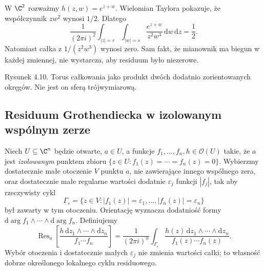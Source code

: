 \begin{przyklad}
W $\C^2$ rozważmy $h(z,w)=e^{z+w}$.
Wielomian Taylora pokazuje, że współczynnik $zw^2$ wynosi $1/2$.
Dlatego
\[
\frac{1}{(2\pi i)^2}\int_{|z|=r}\int_{|w|=s}
\frac{e^{z+w}}{z^2w^3}\,\mathrm dw\,\mathrm dz=\frac12.
\]
Natomiast całka z $1/(z^2w^3)$ wynosi zero. Sam fakt,
że mianownik ma biegun w każdej zmiennej, nie wystarcza,
aby residuum było niezerowe.
\end{przyklad}

\begin{center}

{\small Rysunek 4.10. Torus całkowania jako produkt dwóch dodatnio
zorientowanych okręgów. Nie jest on sferą trójwymiarową.}\par
\end{center}

\subsection{Residuum Grothendiecka w izolowanym wspólnym zerze}
\label{subsec:ga4-groth-res}

\begin{definicja}
\label{def:ga4-groth-res}
Niech $U\subseteq\C^n$ będzie otwarte, $a\in U$, a funkcje
$f_1,\ldots,f_n,h\in\mathcal O(U)$ takie, że $a$ jest
\emph{izolowanym} punktem zbioru
$\{z\in U:f_1(z)=\cdots=f_n(z)=0\}$.
Wybierzmy dostatecznie małe otoczenie $V$ punktu $a$,
nie zawierające innego wspólnego zera, oraz dostatecznie małe regularne
wartości dodatnie $\varepsilon_j$ funkcji $|f_j|$,
tak aby rzeczywisty cykl
\[
\Gamma_\varepsilon=\{z\in V:|f_1(z)|=\varepsilon_1,\ldots,
|f_n(z)|=\varepsilon_n\}
\]
był zawarty w tym otoczeniu.
Orientację wyznacza dodatniość formy
$\mathrm d\arg f_1\wedge\cdots\wedge\mathrm d\arg f_n$.
Definiujemy
\[
\operatorname{Res}_a\!\left[\frac{h\,\mathrm dz_1\wedge\cdots
\wedge\mathrm dz_n}{f_1\cdots f_n}\right]
=\frac1{(2\pi i)^n}\int_{\Gamma_\varepsilon}
\frac{h(z)\,\mathrm dz_1\wedge\cdots\wedge\mathrm dz_n}
{f_1(z)\cdots f_n(z)}.
\]
Wybór otoczenia i dostatecznie małych $\varepsilon_j$
nie zmienia wartości całki; to własność dobrze określonego
lokalnego cyklu residuowego.
\end{definicja}

